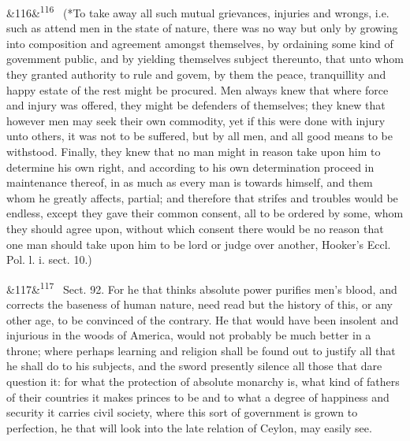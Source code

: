 \documentclass[12pt]{article}
\newcommand{\para}[1][]{\par\noindent\ifx&#1&\else\textsuperscript{\footnotesize #1}~\fi}
\begin{document}
\para[116] (*To take away all such mutual grievances, injuries and wrongs, i.e. such as attend men in the state of nature, there was no way but only by growing into composition and agreement amongst themselves, by ordaining some kind of govemment public, and by yielding themselves subject thereunto, that unto whom they granted authority to rule and govem, by them the peace, tranquillity and happy estate of the rest might be procured. Men always knew that where force and injury was offered, they might be defenders of themselves; they knew that however men may seek their own commodity, yet if this were done with injury unto others, it was not to be suffered, but by all men, and all good means to be withstood. Finally, they knew that no man might in reason take upon him to determine his own right, and according to his own determination proceed in maintenance thereof, in as much as every man is towards himself, and them whom he greatly affects, partial; and therefore that strifes and troubles would be endless, except they gave their common consent, all to be ordered by some, whom they should agree upon, without which consent there would be no reason that one man should take upon him to be lord or judge over another, Hooker's Eccl. Pol. l. i. sect. 10.)

\para[117] Sect. 92. For he that thinks absolute power purifies men's blood, and corrects the baseness of human nature, need read but the history of this, or any other age, to be convinced of the contrary. He that would have been insolent and injurious in the woods of America, would not probably be much better in a throne; where perhaps learning and religion shall be found out to justify all that he shall do to his subjects, and the sword presently silence all those that dare question it: for what the protection of absolute monarchy is, what kind of fathers of their countries it makes princes to be and to what a degree of happiness and security it carries civil society, where this sort of government is grown to perfection, he that will look into the late relation of Ceylon, may easily see.
\end{document}
